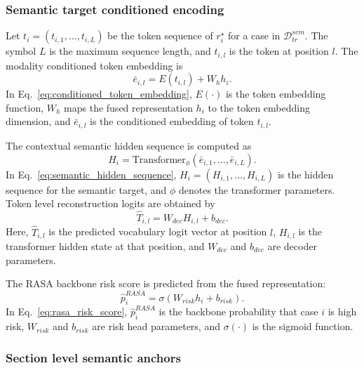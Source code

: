 \subsubsection{Semantic target conditioned encoding}
\label{subsubsec:semantic_target_conditioned_encoding}

Let $t_i=(t_{i,1},\ldots,t_{i,L})$ be the token sequence of $r_i^{\star}$ for a case in $\mathcal{D}_{tr}^{sem}$. The symbol $L$ is the maximum sequence length, and $t_{i,l}$ is the token at position $l$. The modality conditioned token embedding is
\begin{equation}
\bar{e}_{i,l}=E(t_{i,l})+W_hh_i.
\label{eq:conditioned_token_embedding}
\end{equation}
In Eq.~\eqref{eq:conditioned_token_embedding}, $E(\cdot)$ is the token embedding function, $W_h$ maps the fused representation $h_i$ to the token embedding dimension, and $\bar{e}_{i,l}$ is the conditioned embedding of token $t_{i,l}$.

The contextual semantic hidden sequence is computed as
\begin{equation}
H_i=\mathrm{Transformer}_{\phi}(\bar{e}_{i,1},\ldots,\bar{e}_{i,L}).
\label{eq:semantic_hidden_sequence}
\end{equation}
In Eq.~\eqref{eq:semantic_hidden_sequence}, $H_i=(H_{i,1},\ldots,H_{i,L})$ is the hidden sequence for the semantic target, and $\phi$ denotes the transformer parameters. Token level reconstruction logits are obtained by
\begin{equation}
\hat{T}_{i,l}=W_{dec}H_{i,l}+b_{dec}.
\label{eq:token_reconstruction_logits}
\end{equation}
Here, $\hat{T}_{i,l}$ is the predicted vocabulary logit vector at position $l$, $H_{i,l}$ is the transformer hidden state at that position, and $W_{dec}$ and $b_{dec}$ are decoder parameters.

The RASA backbone risk score is predicted from the fused representation:
\begin{equation}
\hat{p}_i^{RASA}=\sigma(W_{risk}h_i+b_{risk}).
\label{eq:rasa_risk_score}
\end{equation}
In Eq.~\eqref{eq:rasa_risk_score}, $\hat{p}_i^{RASA}$ is the backbone probability that case $i$ is high risk, $W_{risk}$ and $b_{risk}$ are risk head parameters, and $\sigma(\cdot)$ is the sigmoid function.

\subsubsection{Section level semantic anchors}
\label{subsubsec:section_level_semantic_anchors}

